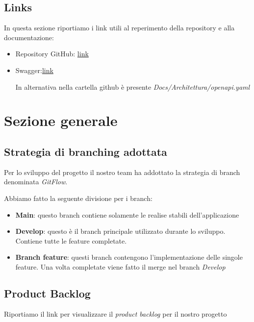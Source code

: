 \documentclass[12pt,a4paper]{article}
\begin{document}
\subsection{Links}

In questa sezione riportiamo i link utili al reperimento della repository e alla documentazione:

\begin{itemize}
    \item Repository GitHub: \href{https://github.com/RiccardoCortese/RiciclApp/tree/main }{link} 
    \item Swagger:\href{https://app.swaggerhub.com/apis/uni-01b-515/RiciclApp/1.0.0}{link} 

    In alternativa nella cartella github è presente \textit{Docs/Architettura/openapi.yaml}
    
\end{itemize}

\section{Sezione generale}

\subsection{Strategia di branching adottata}

Per lo sviluppo del progetto il nostro team ha addottato la strategia di branch denominata \textit{GitFlow}.

Abbiamo fatto la seguente divisione per i branch:
\begin{itemize}
    \item \textbf{Main}: questo branch contiene solamente le realise stabili dell'applicazione
    \item \textbf{Develop}: questo è il branch principale utilizzato durante lo sviluppo. Contiene tutte le feature completate.
    \item \textbf{Branch feature}: questi branch contengono l'implementazione delle singole feature. Una volta completate viene fatto il merge nel branch \textit{Develop}
\end{itemize}

\subsection{Product Backlog}

Riportiamo il link per visualizzare il \textit{product backlog} per il nostro progetto
\end{document}
